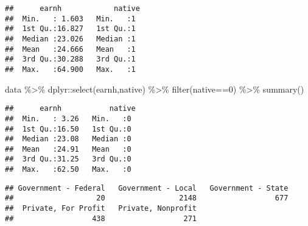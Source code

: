 \documentclass[
]{article}
\newenvironment{Shaded}{\begin{snugshade}}{\end{snugshade}}
\newcommand{\CommentTok}[1]{\textcolor[rgb]{0.56,0.35,0.01}{\textit{#1}}}
\newcommand{\DecValTok}[1]{\textcolor[rgb]{0.00,0.00,0.81}{#1}}
\newcommand{\FunctionTok}[1]{\textcolor[rgb]{0.00,0.00,0.00}{#1}}
\newcommand{\NormalTok}[1]{#1}
\newcommand{\SpecialCharTok}[1]{\textcolor[rgb]{0.00,0.00,0.00}{#1}}
\begin{document}
\begin{verbatim}
##      earnh            native 
##  Min.   : 1.603   Min.   :1  
##  1st Qu.:16.827   1st Qu.:1  
##  Median :23.026   Median :1  
##  Mean   :24.666   Mean   :1  
##  3rd Qu.:30.288   3rd Qu.:1  
##  Max.   :64.900   Max.   :1
\end{verbatim}

\begin{Shaded}
\begin{Highlighting}[]
\NormalTok{data }\SpecialCharTok{\%\textgreater{}\%}\NormalTok{ dplyr}\SpecialCharTok{::}\FunctionTok{select}\NormalTok{(earnh,native) }\SpecialCharTok{\%\textgreater{}\%} \FunctionTok{filter}\NormalTok{(native}\SpecialCharTok{==}\DecValTok{0}\NormalTok{) }\SpecialCharTok{\%\textgreater{}\%} \FunctionTok{summary}\NormalTok{()}
\end{Highlighting}
\end{Shaded}

\begin{verbatim}
##      earnh           native 
##  Min.   : 3.26   Min.   :0  
##  1st Qu.:16.50   1st Qu.:0  
##  Median :23.08   Median :0  
##  Mean   :24.91   Mean   :0  
##  3rd Qu.:31.25   3rd Qu.:0  
##  Max.   :62.50   Max.   :0
\end{verbatim}

\begin{Shaded}
\end{Shaded}

\begin{verbatim}
## Government - Federal   Government - Local   Government - State 
##                   20                 2148                  677 
##  Private, For Profit   Private, Nonprofit 
##                  438                  271
\end{verbatim}
\end{document}
